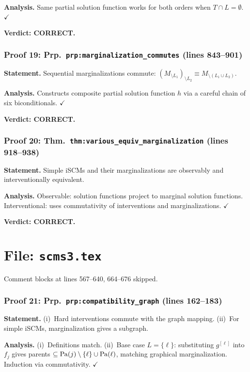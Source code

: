 \documentclass{article}
\begin{document}
\textbf{Analysis.} Same partial solution function works for both orders when
$T\cap L=\emptyset$.  $\checkmark$

\textbf{Verdict: CORRECT.}

\section{Proof 19: Prp.\ \texttt{prp:marginalization\_commutes} (lines 843--901)}
\textbf{Statement.} Sequential marginalizations commute:
$(M_{\setminus L_1})_{\setminus L_2}\equiv M_{\setminus(L_1\cup L_2)}$.

\textbf{Analysis.} Constructs composite partial solution function $h$ via a
careful chain of six biconditionals.  $\checkmark$

\textbf{Verdict: CORRECT.}

\section{Proof 20: Thm.\ \texttt{thm:various\_equiv\_marginalization}
(lines 918--938)}
\textbf{Statement.} Simple iSCMs and their marginalizations are observably and
interventionally equivalent.

\textbf{Analysis.} Observable: solution functions project to marginal solution
functions.  Interventional: uses commutativity of interventions and
marginalizations.  $\checkmark$

\textbf{Verdict: CORRECT.}

\part*{File: \texttt{scms3.tex}}

Comment blocks at lines 567--640, 664--676 skipped.

\section{Proof 21: Prp.\ \texttt{prp:compatibility\_graph} (lines 162--183)}
\textbf{Statement.} (i)~Hard interventions commute with the graph mapping.
(ii)~For simple iSCMs, marginalization gives a subgraph.

\textbf{Analysis.} (i)~Definitions match.  (ii)~Base case $L=\{\ell\}$:
substituting $g^{[\ell]}$ into $f_j$ gives parents
$\subseteq\mathrm{Pa}(j)\setminus\{\ell\}\cup\mathrm{Pa}(\ell)$, matching graphical
marginalization.  Induction via commutativity.  $\checkmark$
\end{document}
